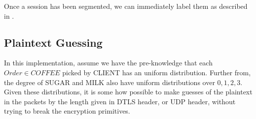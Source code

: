 \begin{example}
Once a session has been segmented, we can immediately label them as described in .

\subsection{Plaintext Guessing} \label{Sec: Plaintext Guessing}
In this implementation, assume we have the pre-knowledge that each $Order \in COFFEE$ picked by CLIENT has an uniform distribution. Further from, the degree of SUGAR and MILK also have uniform distributions over ${0,1,2,3}$. Given these distributions, it is some how possible to make guesses of the plaintext in the packets by the length given in DTLS header, or UDP header, without trying to break the encryption primitives.
%
%
%
%
%
%
%
%
%
%
%
%

\end{example}
